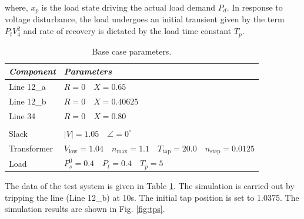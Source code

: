 \documentclass{article}	%
\begin{document}
where, $x_p$ is the load state driving the actual load demand $P_d$. In response to voltage disturbance, the load undergoes an initial transient given by the term $P_t V_4^2$ and rate of recovery is dictated by the load time constant $T_p$.

\begin{table}[H]
  \caption{Base case parameters.}\label{tab:dataps}
  \centering
  \begin{tabular}{p{2cm}l}
    \toprule
    \emph{Component} & \emph{Parameters}                                                                                    \\
    \midrule
    Line 12\_a       & $R=0 \quad X = 0.65$                                                                                 \\
    Line 12\_b       & $R=0 \quad X = 0.40625$                                                                              \\
    Line 34          & $R=0 \quad X = 0.80$                                                                                 \\
                     &                                                                                                      \\
    Slack            & $|V|= 1.05 \quad \angle = 0^\circ$                                                                         \\
    Transformer      & $V_\text{low}=1.04 \quad n_\text{max} = 1.1 \quad T_\text{tap} = 20.0 \quad n_\text{step} = 0.0125 $ \\
    Load             & $P_s^0=0.4 \quad P_t = 0.4 \quad T_p = 5  $                                                          \\
    \bottomrule
  \end{tabular}
\end{table}
The data of the test system is given in Table \ref{tab:dataps}. The simulation is carried out by tripping the line (Line 12\_b) at 10s. The initial tap position is set to 1.0375. The simulation results are shown in Fig. \ref{fig:tps}.
\end{document}
